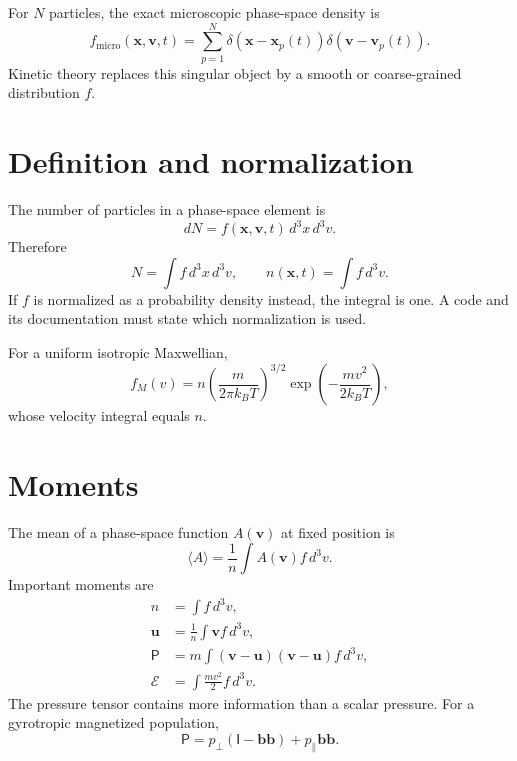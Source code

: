 \documentclass[11pt]{article}
\begin{document}
For $N$ particles, the exact microscopic phase-space density is
\begin{equation}
f_{\mathrm{micro}}(\mathbf x,\mathbf v,t)=
\sum_{p=1}^{N}\delta(\mathbf x-\mathbf x_p(t))
\delta(\mathbf v-\mathbf v_p(t)).
\end{equation}
Kinetic theory replaces this singular object by a smooth or coarse-grained distribution $f$.

\section{Definition and normalization}
The number of particles in a phase-space element is
\begin{equation}
dN=f(\mathbf x,\mathbf v,t)\,d^3x\,d^3v.
\end{equation}
Therefore
\begin{equation}
N=\int f\,d^3x\,d^3v,
\qquad
n(\mathbf x,t)=\int f\,d^3v.
\end{equation}
If $f$ is normalized as a probability density instead, the integral is one. A code and its documentation must state which normalization is used.

For a uniform isotropic Maxwellian,
\begin{equation}
f_M(v)=n\left(\frac{m}{2\pi k_BT}\right)^{3/2}
\exp\!\left(-\frac{mv^2}{2k_BT}\right),
\end{equation}
whose velocity integral equals $n$.

\section{Moments}
The mean of a phase-space function $A(\mathbf v)$ at fixed position is
\begin{equation}
\langle A\rangle=\frac{1}{n}\int A(\mathbf v)f\,d^3v.
\end{equation}
Important moments are
\begin{align}
n&=\int f\,d^3v,\\
\mathbf u&=\frac{1}{n}\int\mathbf v f\,d^3v,\\
\mathsf P&=m\int(\mathbf v-\mathbf u)(\mathbf v-\mathbf u)f\,d^3v,\\
\mathcal E&=\int\frac{mv^2}{2}f\,d^3v.
\end{align}
The pressure tensor contains more information than a scalar pressure. For a gyrotropic magnetized population,
\begin{equation}
\mathsf P=p_\perp(\mathsf I-\mathbf b\mathbf b)+p_\parallel\mathbf b\mathbf b.
\end{equation}
\end{document}
